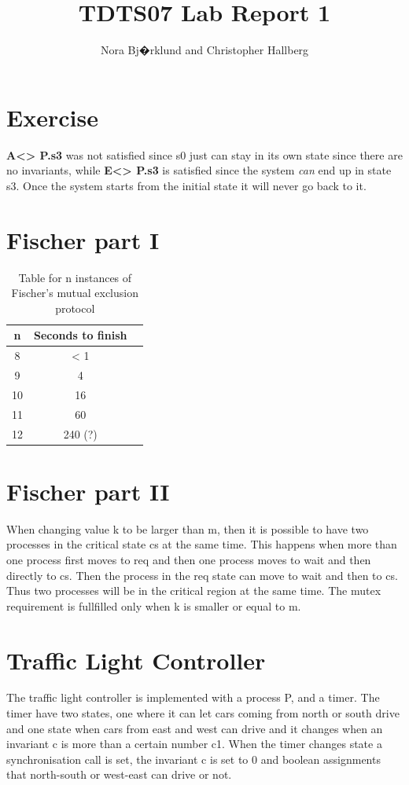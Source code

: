 \documentclass[12pt]{article}
\title{TDTS07 Lab Report 1}
\author{Nora Bj�rklund and Christopher Hallberg}
\begin{document}
\maketitle

\section{Exercise}
\textbf{A<> P.s3} was not satisfied since s0 just can stay in its own state since there are no invariants, while \textbf{E<> P.s3} is satisfied since the system \textit{can} end up in state s3. Once the system starts from the initial state it will never go back to it. 
\section{Fischer part I}
\begin{table}[h]
  \centering
  \begin{tabular}{|c|c|c|}
    \hline
    n  & Seconds to finish \\
    \hline
    8  & < 1 \\
    9  & 4 \\
    10 & 16 \\
    11 & 60 \\
    12 & 240 (?) \\
    \hline
  \end{tabular}
  \caption{Table for n instances of Fischer's mutual exclusion protocol }
  \label{tab:n_fischer}
\end{table}
\section{Fischer part II}
When changing value k to be larger than m, then it is possible to have two processes in the critical state cs at the same time. This happens when more than one process first moves to req and then one process moves to wait and then directly to cs. Then the process in the req state can move to wait and then to cs. Thus two processes will be in the critical region at the same time.
The mutex requirement is fullfilled only when k is smaller or equal to m.
\section{Traffic Light Controller}
The traffic light controller is implemented with a process P, and a timer. The timer have two states, one where it can let cars coming from north or south drive and one state when cars from east and west can drive and it changes when an invariant c is more than a certain number c1. When the timer changes state a synchronisation call is set, the invariant c is set to 0 and boolean assignments that north-south or west-east can drive or not.
\end{document}
